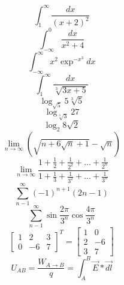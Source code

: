 \documentclass{article}
\begin{document}
\begin{equation}
	\int_{1}^\infty \frac{dx}{(x+2)^2}
\end{equation}
\begin{equation}
 	\int_{-\infty}^0 \frac{dx}{x^2+4}
\end{equation}
\begin{equation}
 	\int_{-\infty}^{\infty} x^2 \exp ^{-x^3}dx
\end{equation}
\begin{equation}
 	\int_{1}^{\infty} \frac{dx}{\sqrt[3]{3x+5}}
\end{equation}
\begin{equation}
 	\log_{\sqrt{5}}5\sqrt[3]{5}
\end{equation}
\begin{equation}
 	\log_{\sqrt[3]{3}}27
\end{equation}
\begin{equation}
 	\log_{2}8\sqrt{2}
\end{equation}
\begin{equation}
 	\lim_{n\rightarrow \infty}\left( \sqrt{n+6\sqrt{n}+1}-\sqrt{n} \right)
\end{equation}
\begin{equation}
 	\lim_{n\rightarrow \infty} \frac{1+\frac{1}{2}+\frac{1}{2^2}+\ldots + \frac{1}{2^n}}{1+\frac{1}{3}+\frac{1}{3^2}+\ldots +\frac{1}{3^n}}
\end{equation}
\begin{equation}
 	\sum_{n-1}^{\infty}(-1)^{n+1}(2n-1)
\end{equation}
\begin{equation}
 	\sum_{n-1}^{\infty}\sin \frac{2\pi}{3^n}\cos \frac{4\pi}{3^n}
\end{equation}
\begin{equation}
 	\left[
 	\begin{array}{ccc}
	1&2&3 \\
	0&-6&7
 	\end{array}
 	\right]
 	^T=
 	\left[
 	\begin{array}{cc}
 	1&0 \\
 	2&-6 \\
 	3&7
 	\end{array}
 	\right]
\end{equation}
\begin{equation}
 	U_{AB}= \frac{W_{A\rightarrow B}}{q} = \int_A^B \vec E * \vec{dl}
\end{equation}
\end{document}
